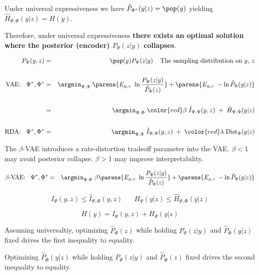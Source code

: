 {\vfill
Under universal expressiveness we have $\hat{P}_{\Phi^*}(y|z) = \pop(y)$ yielding {\color{red} $\hat{H}_{\Psi,\Phi}(y|z) = H(y)$}.

\vfill
Therefore, under universal expressiveness {\bf there exists an optimal solution where
the posterior (encoder) $P_\Psi(z|y)$ collapses}.


{\huge
\begin{eqnarray*}
P_\Psi(y,z) & = & \pop(y)P_\Psi(z|y)\;\;\;\;\mbox{The sampling distribution on $y$, $z$} \\
\\
\mbox{VAE:}\;\;\;\Psi^*,\Phi^*  & = & \argmin_{\Psi,\Phi}\; \parens{E_{y,z} \;\;{\ln \frac{P_\Psi(z|y)}{\hat{P}_\Phi(z)}}}  + \parens{E_{y,z}\;-\ln {\hat{P}_\Phi(y|z)}} \\
\\
& = & \argmin_{\Psi,\Phi}\; {\color{red} \beta}\; \hat{I}_{\Psi,\Phi}(y,z) \;+\; \hat{H}_{\Psi,\Phi}(y|z) \\
\\
\mbox{RDA:}\;\;\;\Psi^*,\Phi^*  & = &  \argmin_{\Psi,\Phi}\;  \hat{I}_{\Psi,\Phi}(y,z) \;+\; {\color{red} \lambda}\;\mathrm{Dist}_\Phi(y|z)
\end{eqnarray*}
}

The $\beta$-VAE introduces a rate-distortion tradeoff parameter into the VAE.  $\beta < 1$ may avoid posterior collapse.  $\beta > 1$ may improve interpretability.


{\huge
\begin{eqnarray*}
\mbox{$\beta$-VAE:}\;\;\;\Psi^*,\Phi^*  & = & \argmin_{\Psi,\Phi}\; \beta\parens{E_{y,z} \;\;{\ln \frac{P_\Psi(z|y)}{\hat{P}_\Phi(z)}}}  + \parens{E_{y,z}\;-\ln {\hat{P}_\Phi(y|z)}}
\end{eqnarray*}


{\color{red}
$$I_\Psi(y,z) \leq \hat{I}_{\Psi,\Phi}(y,z) \;\;\;\;\;\; H_\Psi(y|z) \leq \hat{H}_{\Psi,\Phi}(y|z)$$

$$H(y) = I_\Psi(y,z) + H_\Psi(y|z)$$}
}

Assuming universaltiy, optimizing $\hat{P}_\Phi(z)$ while holding $P_\Psi(z|y)$ and $\hat{P}_\Phi(y|z)$ fixed drives the first inequality to equality.

\vfill
Optimizing $\hat{P}_\Phi(y|z)$ while holding $P_\Psi(z|y)$ and $\hat{P}_\Phi(z)$ fixed drives the second inequality to equality.

}
